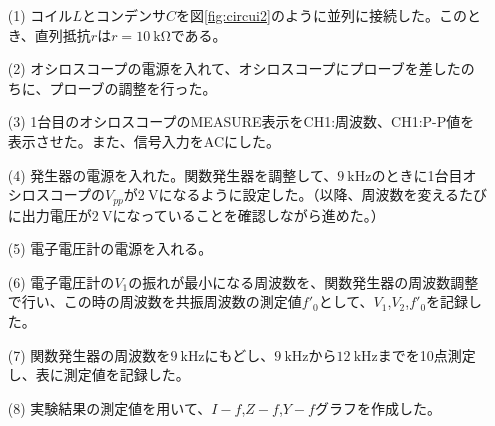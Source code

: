 \documentclass[12pt,a4paper]{jsarticle}
\numberwithin{equation}{section}
\numberwithin{figure}{section}
\numberwithin{table}{section}
\begin{document}
  \begin{itemize}
    \item [(1)]コイル$L$とコンデンサ$C$を図\ref{fig:circui2}のように並列に接続した。このとき、直列抵抗$r$は$r=\SI{10}{\kilo\ohm}$である。
    \item [(2)]オシロスコープの電源を入れて、オシロスコープにプローブを差したのちに、プローブの調整を行った。
    \item [(3)]1台目のオシロスコープのMEASURE表示をCH1:周波数、CH1:P-P値を表示させた。また、信号入力をACにした。
    \item [(4)]発生器の電源を入れた。関数発生器を調整して、$\SI{9}{\kilo\hertz}$のときに1台目オシロスコープの$V_{pp}$が$\SI{2}{\volt}$になるように設定した。（以降、周波数を変えるたびに出力電圧が$\SI{2}{\volt}$になっていることを確認しながら進めた。）
    \item [(5)]電子電圧計の電源を入れる。
    \item [(6)]電子電圧計の$\si{V_1}$の振れが最小になる周波数を、関数発生器の周波数調整で行い、この時の周波数を共振周波数の測定値$f'_0$として、$V_1$,$V_2$,$f'_0$を記録した。
    \item [(7)] 関数発生器の周波数を$\SI{9}{\kilo\hertz}$にもどし、$\SI{9}{\kilo\hertz}$から$\SI{12}{\kilo\hertz}$までを10点測定し、表に測定値を記録した。
    \item [(8)]実験結果の測定値を用いて、$I-f$,$Z-f$,$Y-f$グラフを作成した。
  \end{itemize}
\end{document}
